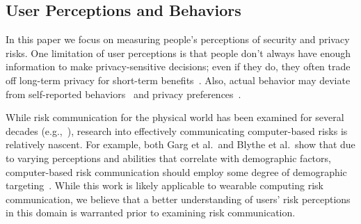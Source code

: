 \subsection{User Perceptions and Behaviors}
In this paper we focus on measuring people's perceptions of security and privacy risks. One limitation of user perceptions is that people don't always have enough information to make privacy-sensitive decisions; even if they do, they often trade off long-term privacy for short-term benefits~\cite{acquisti2005privacy}. Also, actual behavior may deviate from self-reported behaviors~\cite{jensen2005privacy} and privacy preferences~\cite{spiekermann2001privacy}.

While risk communication for the physical world has been examined for several decades (e.g.,~\cite{Fischhoff,Morgan2001}), research into effectively communicating computer-based risks is relatively nascent. For example, both Garg et al.\ and Blythe et al.\ show that due to varying perceptions and abilities that correlate with demographic factors, computer-based risk communication should employ some degree of demographic targeting~\cite{Garg2012,Blythe2011}. While this work is likely applicable to wearable computing risk communication, we believe that a better understanding of users' risk perceptions in this domain is warranted prior to examining risk communication.
